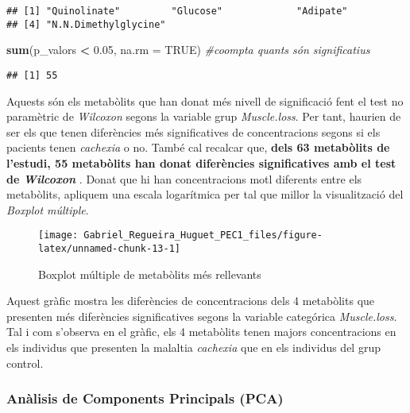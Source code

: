 \documentclass[
]{article}
\newenvironment{Shaded}{\begin{snugshade}}{\end{snugshade}}
\newcommand{\AttributeTok}[1]{\textcolor[rgb]{0.13,0.29,0.53}{#1}}
\newcommand{\CommentTok}[1]{\textcolor[rgb]{0.56,0.35,0.01}{\textit{#1}}}
\newcommand{\ConstantTok}[1]{\textcolor[rgb]{0.56,0.35,0.01}{#1}}
\newcommand{\FloatTok}[1]{\textcolor[rgb]{0.00,0.00,0.81}{#1}}
\newcommand{\FunctionTok}[1]{\textcolor[rgb]{0.13,0.29,0.53}{\textbf{#1}}}
\newcommand{\NormalTok}[1]{#1}
\newcommand{\SpecialCharTok}[1]{\textcolor[rgb]{0.81,0.36,0.00}{\textbf{#1}}}
\begin{document}
\begin{verbatim}
## [1] "Quinolinate"         "Glucose"             "Adipate"            
## [4] "N.N.Dimethylglycine"
\end{verbatim}

\begin{Shaded}
\begin{Highlighting}[]
\FunctionTok{sum}\NormalTok{(p\_valors }\SpecialCharTok{\textless{}} \FloatTok{0.05}\NormalTok{, }\AttributeTok{na.rm =} \ConstantTok{TRUE}\NormalTok{) }\CommentTok{\#coompta quants són significatius}
\end{Highlighting}
\end{Shaded}

\begin{verbatim}
## [1] 55
\end{verbatim}

Aquests són els metabòlits que han donat més nivell de significació fent
el test no paramètric de \emph{Wilcoxon} segons la variable grup
\emph{Muscle.loss}. Per tant, haurien de ser els que tenen diferències
més significatives de concentracions segons si els pacients tenen
\emph{cachexia} o no. També cal recalcar que, \textbf{dels 63 metabòlits
de l'estudi, 55 metabòlits han donat diferències significatives amb el
test de \emph{Wilcoxon} }. Donat que hi han concentracions motl
diferents entre els metabòlits, apliquem una escala logarítmica per tal
que millor la visualització del \emph{Boxplot múltiple}.

\begin{figure}

{\centering \texttt{[image: Gabriel\_Regueira\_Huguet\_PEC1\_files/figure-latex/unnamed-chunk-13-1]} 

}

\caption{Boxplot múltiple de metabòlits més rellevants}\label{fig:unnamed-chunk-13}
\end{figure}

Aquest gràfic mostra les diferències de concentracions dels 4 metabòlits
que presenten més diferències significatives segons la variable
categórica \emph{Muscle.loss}. Tal i com s'observa en el gràfic, els 4
metabòlits tenen majors concentracions en els individus que presenten la
malaltia \emph{cachexia} que en els individus del grup control.

\subsubsection{Anàlisis de Components Principals
(PCA)}\label{anuxe0lisis-de-components-principals-pca}
\end{document}
